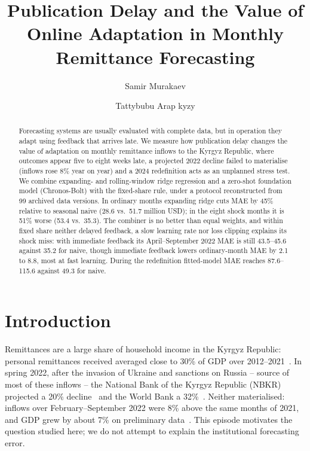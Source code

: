 \documentclass[runningheads]{llncs}
\begin{document}
\title{Publication Delay and the Value of Online Adaptation in Monthly Remittance Forecasting}

\author{Samir Murakaev \and Tattybubu Arap kyzy}

\maketitle

\begin{abstract}
Forecasting systems are usually evaluated with complete data, but in operation they adapt using
feedback that arrives late. We measure how publication delay changes the value of adaptation on
monthly remittance inflows to the Kyrgyz Republic, where outcomes appear five to eight weeks late,
a projected 2022 decline failed to materialise (inflows rose 8\% year on year) and a 2024
redefinition acts as an unplanned stress test. We combine expanding- and rolling-window ridge
regression and a zero-shot foundation model (Chronos-Bolt) with the fixed-share rule, under a
protocol reconstructed from 99 archived data versions. In ordinary months expanding ridge cuts MAE
by 45\% relative to seasonal naive (28.6 vs.\ 51.7 million USD); in the eight shock months it is
51\% worse (53.4 vs.\ 35.3). The combiner is no better than equal weights, and within fixed share neither
delayed feedback, a slow learning rate nor loss clipping explains its shock miss: with immediate
feedback its April--September 2022 MAE is still 43.5--45.6 against 35.2 for naive, though immediate
feedback lowers ordinary-month MAE by 2.1 to 8.8, most at fast learning. During the
redefinition fitted-model MAE reaches 87.6--115.6 against 49.3 for naive.

\end{abstract}

\section{Introduction}

Remittances are a large share of household income in the Kyrgyz Republic: personal remittances
received averaged close to 30\% of GDP over 2012--2021~\cite{wdi}. In spring 2022, after the
invasion of Ukraine and sanctions on Russia -- source of most of these inflows -- the National Bank
of the Kyrgyz Republic (NBKR) projected a 20\% decline~\cite{eurasianet} and the World Bank a 32\%~\cite{wb2022brief}.
Neither materialised: inflows over February--September 2022 were 8\% above the same months of 2021,
and GDP grew by about 7\% on preliminary data~\cite{interfax}. This episode motivates the question
studied here; we do not attempt to explain the institutional forecasting error.
\end{document}

